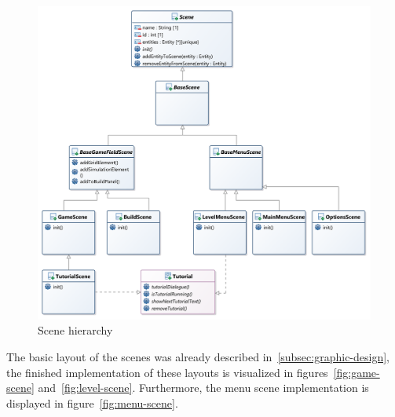 \begin{figure}
    \centering
    \includegraphics[width=\textwidth]{Pictures/res/implementation/scenes-hierarchy}
    \caption{Scene hierarchy}
    \label{fig:scenes-hierachry}
\end{figure}

The basic layout of the scenes was already described in~\ref{subsec:graphic-design}, the finished implementation of these
layouts is visualized in figures~\ref{fig:game-scene} and~\ref{fig:level-scene}.
Furthermore, the menu scene implementation is displayed in figure~\ref{fig:menu-scene}.

